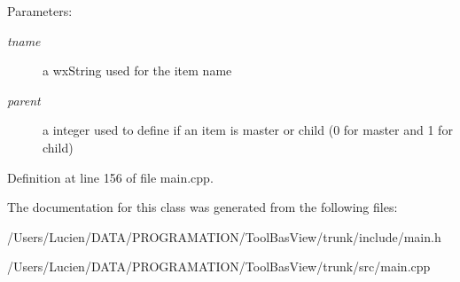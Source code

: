 \begin{Desc}
\item[Parameters:]
\begin{description}
\item[{\em tname}]a wx\-String used for the item name \item[{\em parent}]a integer used to define if an item is master or child (0 for master and 1 for child) \end{description}
\end{Desc}


Definition at line 156 of file main.cpp.

The documentation for this class was generated from the following files:\begin{CompactItemize}
\item 
/Users/Lucien/DATA/PROGRAMATION/Tool\-Bas\-View/trunk/include/main.h\item 
/Users/Lucien/DATA/PROGRAMATION/Tool\-Bas\-View/trunk/src/main.cpp\end{CompactItemize}
